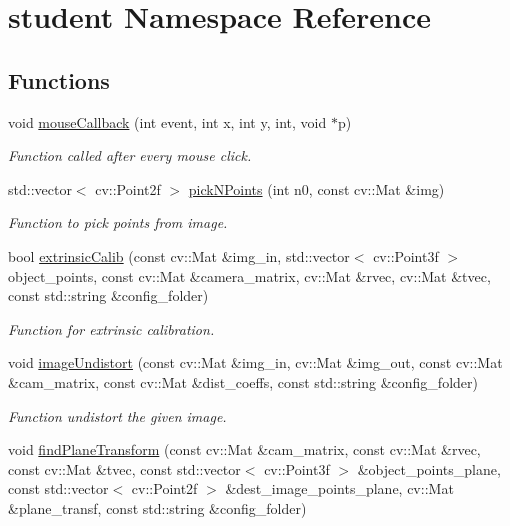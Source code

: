 \hypertarget{namespacestudent}{}\section{student Namespace Reference}
\label{namespacestudent}
\subsection*{Functions}
\begin{DoxyCompactItemize}
\item 
void \hyperlink{namespacestudent_ab3f1d6c8dd4caa817efc0cd3c46eb2e0}{mouse\+Callback} (int event, int x, int y, int, void $\ast$p)
\begin{DoxyCompactList}\small\item\em Function called after every mouse click. \end{DoxyCompactList}\item 
std\+::vector$<$ cv\+::\+Point2f $>$ \hyperlink{namespacestudent_a01244e0e0a28d974de100ffcad7a2583}{pick\+N\+Points} (int n0, const cv\+::\+Mat \&img)
\begin{DoxyCompactList}\small\item\em Function to pick points from image. \end{DoxyCompactList}\item 
bool \hyperlink{namespacestudent_a6103f938ce28f8820c48c089d5f95098}{extrinsic\+Calib} (const cv\+::\+Mat \&img\+\_\+in, std\+::vector$<$ cv\+::\+Point3f $>$ object\+\_\+points, const cv\+::\+Mat \&camera\+\_\+matrix, cv\+::\+Mat \&rvec, cv\+::\+Mat \&tvec, const std\+::string \&config\+\_\+folder)
\begin{DoxyCompactList}\small\item\em Function for extrinsic calibration. \end{DoxyCompactList}\item 
void \hyperlink{namespacestudent_aceb2a29362b8223a9d3601d9496e1c98}{image\+Undistort} (const cv\+::\+Mat \&img\+\_\+in, cv\+::\+Mat \&img\+\_\+out, const cv\+::\+Mat \&cam\+\_\+matrix, const cv\+::\+Mat \&dist\+\_\+coeffs, const std\+::string \&config\+\_\+folder)
\begin{DoxyCompactList}\small\item\em Function undistort the given image. \end{DoxyCompactList}\item 
void \hyperlink{namespacestudent_a528d33658d0d4d982a46f18b7abb4a70}{find\+Plane\+Transform} (const cv\+::\+Mat \&cam\+\_\+matrix, const cv\+::\+Mat \&rvec, const cv\+::\+Mat \&tvec, const std\+::vector$<$ cv\+::\+Point3f $>$ \&object\+\_\+points\+\_\+plane, const std\+::vector$<$ cv\+::\+Point2f $>$ \&dest\+\_\+image\+\_\+points\+\_\+plane, cv\+::\+Mat \&plane\+\_\+transf, const std\+::string \&config\+\_\+folder)

\end{DoxyCompactItemize}

